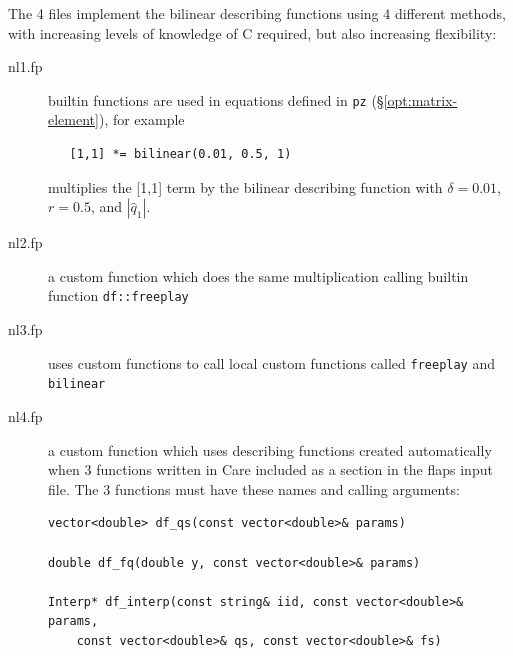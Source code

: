 \documentclass[11pt,openany,twoside]{book}
\numberwithin{equation}{section}		%
\def\Cpp{{C\nolinebreak[4]\hspace{-.05em}\raisebox{.4ex}{\tiny\bf ++}}\:}
\newcommand{\Code}[1]{{\small\tt #1}}
\newcommand{\Matrix}[1]{\boldsymbol{#1}}
\newcommand{\Vector}[1]{\boldsymbol{#1}}
\newcommand{\Sectref}[1]{\S\ref{#1}}
\begin{document}
The 4 files implement the bilinear describing functions using 4
different methods, with increasing levels of knowledge of \Cpp
required, but also increasing flexibility:
\begin{description}
\item[nl1.fp] builtin functions are used in equations defined in
\Code{pz} (\Sectref{opt:matrix-element}), for example
\begin{lstlisting}
   [1,1] *= bilinear(0.01, 0.5, 1)
\end{lstlisting}
multiplies the [1,1] term by the bilinear describing function with
$\delta=0.01$, $r = 0.5$, and $|\hat{q}_1|$.

\item[nl2.fp] a custom function which does the same multiplication
calling builtin function \Code{df::freeplay}

\item[nl3.fp] uses custom functions to call local custom functions
called \Code{freeplay} and \Code{bilinear}

\item[nl4.fp] a custom function which uses describing functions
created automatically when 3 functions written in \Cpp are included as
a section in the flaps input file. The 3 functions must have these names and
calling arguments:
	\begin{lstlisting}
vector<double> df_qs(const vector<double>& params)

double df_fq(double y, const vector<double>& params)

Interp* df_interp(const string& iid, const vector<double>& params,
    const vector<double>& qs, const vector<double>& fs)
	\end{lstlisting}

\end{description}
\end{document}
